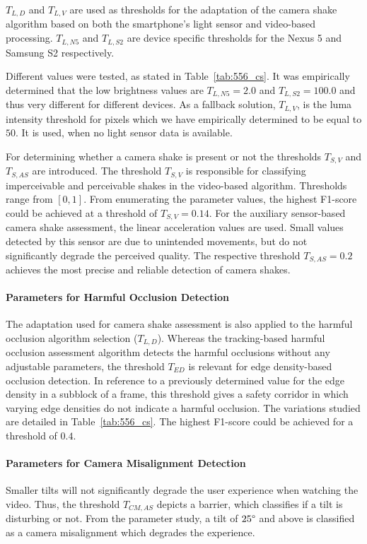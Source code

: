 $T_{L,D}$ and $T_{L,V}$ are used as thresholds for the adaptation of the camera shake algorithm based on both the smartphone's light sensor and video-based processing. 
$T_{L,N5}$ and $T_{L,S2}$ are device specific thresholds for the Nexus 5 and Samsung S2 respectively. %

Different values were tested, as stated in Table~\ref{tab:556_cs}. 
It was empirically determined that the low brightness values are $T_{L,N5}=2.0$ and $T_{L,S2}= 100.0$ and thus very different for different devices.
As a fallback solution, $T_{L,V}$, is the luma intensity threshold for pixels which we have empirically determined to be equal to $50$.
It is used, when no light sensor data is available.

For determining whether a camera shake is present or not the thresholds $T_{S,V}$ and $T_{S,AS}$ are introduced.
The threshold $T_{S,V}$ is responsible for classifying imperceivable and perceivable shakes in the video-based algorithm.
Thresholds range from $[0,1]$.
From enumerating the parameter values, the highest F1-score could be achieved at a threshold of $T_{S,V}=0.14$.
For the auxiliary sensor-based camera shake assessment, the linear acceleration values are used. Small values detected by this sensor are due to unintended movements, but do not significantly degrade the perceived quality.
The respective threshold $T_{S,AS} = 0.2$ achieves the most precise and reliable detection of camera shakes.
\paragraph{Parameters for Harmful Occlusion Detection}
The adaptation used for camera shake assessment is also applied to the harmful occlusion algorithm selection ($T_{L,D}$). 
Whereas the tracking-based harmful occlusion assessment algorithm detects the harmful occlusions without any adjustable parameters, the threshold $T_{ED}$  is relevant for edge density-based occlusion detection.
In reference to a previously determined value for the edge density in a subblock of a frame, this threshold gives a safety corridor in which  varying edge densities do not indicate a harmful occlusion.
The variations studied are detailed in Table~\ref{tab:556_cs}. 
The highest F1-score could be achieved for a threshold of $0.4$.
\paragraph{Parameters for Camera Misalignment Detection}
\label{sec:556_paramCo}
Smaller tilts will not significantly degrade the user experience when watching the video.
Thus, the threshold $T_{CM,AS}$ depicts a barrier, which classifies if a tilt is disturbing or not.
From the parameter study, a tilt of $25\degree$ and above is classified as a camera misalignment which degrades the experience.
